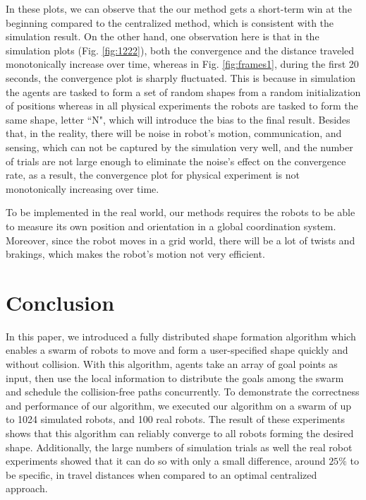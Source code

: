 \documentclass[journal]{IEEEtran}
\begin{document}
In these plots, we can observe that the our method gets a short-term win
at the beginning compared to the centralized method, which is consistent with the simulation result. On the other hand, one observation here is that in the simulation plots (Fig. \ref{fig:1222}), both the convergence and the distance traveled monotonically increase over time, whereas in Fig. \ref{fig:frames1}, during the first 20 seconds, the convergence plot is sharply fluctuated. This is because in simulation the agents are tasked to form a set of random shapes from a random initialization of positions whereas in all physical experiments the robots are tasked to form the same shape, letter ``N", which will introduce the bias to the final result. Besides that, in the reality, there will be noise in robot's motion, communication, and sensing, which can not be captured by the simulation very well, and the number of trials are not large enough to eliminate the noise's effect on the convergence rate, as a result, the convergence plot for physical experiment is not monotonically increasing over time. 




To be implemented in the real world, our methods requires the robots to be able to measure its own position and orientation in a global coordination system. Moreover, since the robot moves in a grid world, there will be a lot of twists and brakings, which makes the robot's motion not very efficient. 

\section{Conclusion}

In this paper, we introduced a fully distributed shape formation algorithm which enables a swarm of robots to move and form a user-specified shape quickly and without collision. With this algorithm, agents take an array of goal points as input, then use the local information to distribute the goals among the swarm and schedule the collision-free paths concurrently. To demonstrate the correctness and performance of our algorithm, we executed our algorithm on a swarm of up to 1024 simulated robots, and 100 real robots.  The result of these experiments shows that this algorithm can reliably converge to all robots forming the desired shape. Additionally, the large numbers of simulation trials as well the real robot experiments showed that it can do so with only a small difference, around $25\%$ to be specific, in travel distances when compared to an optimal centralized approach. 
\end{document}
